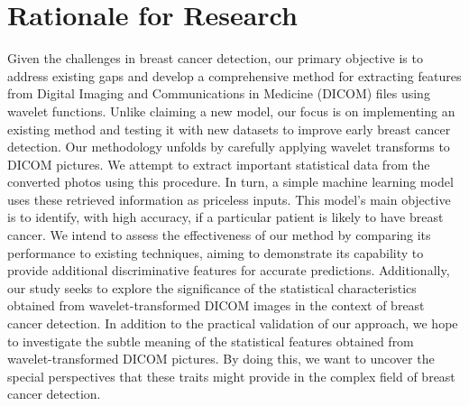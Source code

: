 \section{Rationale for Research}
Given the challenges in breast cancer detection, our primary objective is to address existing gaps and develop a comprehensive method for extracting features from Digital Imaging and Communications in Medicine (DICOM) files using wavelet functions. Unlike claiming a new model, our focus is on implementing an existing method and testing it with new datasets to improve early breast cancer detection. 
\newline Our methodology unfolds by carefully applying wavelet transforms to DICOM pictures. We attempt to extract important statistical data from the converted photos using this procedure. In turn, a simple machine learning model uses these retrieved information as priceless inputs. This model's main objective is to identify, with high accuracy, if a particular patient is likely to have breast cancer. 
\newline We intend to assess the effectiveness of our method by comparing its performance to existing techniques, aiming to demonstrate its capability to provide additional discriminative features for accurate predictions. Additionally, our study seeks to explore the significance of the statistical characteristics obtained from wavelet-transformed DICOM images in the context of breast cancer detection.
\newline In addition to the practical validation of our approach, we hope to investigate the subtle meaning of the statistical features obtained from wavelet-transformed DICOM pictures. By doing this, we want to uncover the special perspectives that these traits might provide in the complex field of breast cancer detection.
